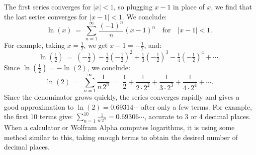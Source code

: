 \documentclass[11pt]{article}
\begin{document}
The first series converges for $|x|<1$, 
so plugging $x{-}1$ in place of $x$,
we find that the last series converges for $|x{-}1|<1$.
We conclude:
$$
\ln(x) \ =\ \sum_{n=1}^\infty \frac{(-1)^n}{n}(x{-}1)^n \quad\text{for}\quad |x{-}1|<1.
$$
For example, taking $x=\frac12$, we get $x{-}1=-\frac12$, and:
$$
\ln(\tfrac12)\ =\  (-\tfrac12) - \tfrac12(-\tfrac12)^2 + \tfrac13(-\tfrac12)^3 -
\tfrac14(-\tfrac12)^4+\cdots.
$$
Since $\ln(\frac12)=-\ln(2)$, we conclude:
$$
\ln(2) \ =\ 
\sum_{n=1}^\infty \frac1{n\,2^n}
\ =\
\frac12 +\frac1{2\cdot2^2}+\frac1{3\cdot2^3}+\frac1{4\cdot2^4}+\cdots.
$$
Since the denominator grows quickly, the series converges rapidly and gives a good approximation to $\ln(2)=0.69314\cdots$ after only a few terms.
For example, the first 10 terms give:
$\sum_{n=1}^{10} \frac1{n\,2^n}=0.69306\cdots$, accurate to 3 or 4 decimal places.
When a calculator or Wolfram Alpha computes logarithms, it is using some method similar to this, taking enough terms to obtain the desired number of decimal places.
\newpage
\end{document}
